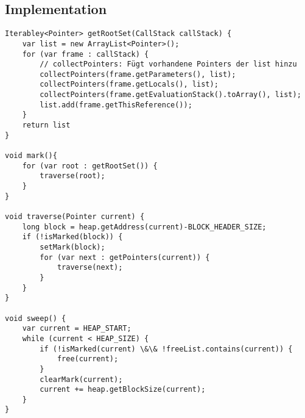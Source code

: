 \subsection{Implementation}
\begin{lstlisting}
Iterabley<Pointer> getRootSet(CallStack callStack) {
    var list = new ArrayList<Pointer>();
    for (var frame : callStack) {
        // collectPointers: Fügt vorhandene Pointers der list hinzu
        collectPointers(frame.getParameters(), list);
        collectPointers(frame.getLocals(), list);
        collectPointers(frame.getEvaluationStack().toArray(), list);
        list.add(frame.getThisReference());
    }
    return list
}

void mark(){
    for (var root : getRootSet()) {
        traverse(root);
    }
}

void traverse(Pointer current) {
    long block = heap.getAddress(current)-BLOCK_HEADER_SIZE;
    if (!isMarked(block)) {
        setMark(block);
        for (var next : getPointers(current)) {
            traverse(next);
        }
    }
}

void sweep() {
    var current = HEAP_START;
    while (current < HEAP_SIZE) {
        if (!isMarked(current) \&\& !freeList.contains(current)) {
            free(current);
        }
        clearMark(current);
        current += heap.getBlockSize(current);
    }
}


\end{lstlisting}